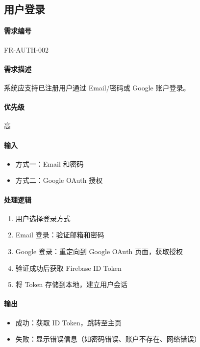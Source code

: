 \subsection{用户登录}

\paragraph{需求编号} FR-AUTH-002

\paragraph{需求描述} 系统应支持已注册用户通过 Email/密码或 Google 账户登录。

\paragraph{优先级} 高

\paragraph{输入}
\begin{itemize}
    \item 方式一：Email 和密码
    \item 方式二：Google OAuth 授权
\end{itemize}

\paragraph{处理逻辑}
\begin{enumerate}
    \item 用户选择登录方式
    \item Email 登录：验证邮箱和密码
    \item Google 登录：重定向到 Google OAuth 页面，获取授权
    \item 验证成功后获取 Firebase ID Token
    \item 将 Token 存储到本地，建立用户会话
\end{enumerate}

\paragraph{输出}
\begin{itemize}
    \item 成功：获取 ID Token，跳转至主页
    \item 失败：显示错误信息（如密码错误、账户不存在、网络错误）
\end{itemize}


